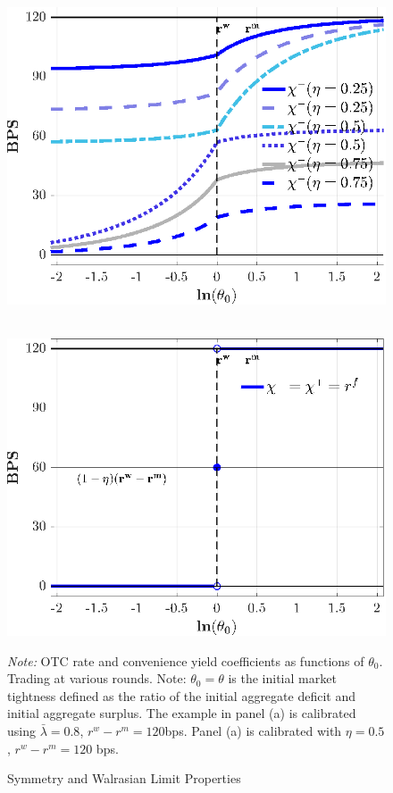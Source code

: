 \documentclass[12pt,american,english,notitlepage]{article}
\begin{document}
\begin{figure}[h]
\centering{}
\begin{minipage}[b]{.45\linewidth}
 \\[4pt]
\includegraphics[width=1\linewidth]{NewCode/Figures/F_l_symmetry_theta.eps}
\end{minipage}
\hfill
    \begin{minipage}[b]{.45\linewidth}
     \\[4pt]
\includegraphics[width=1\linewidth]{NewCode/Figures/F_Walrasian_prices_theta.eps}
\end{minipage}
\caption{\label{fig:symmetry} Symmetry and Walrasian Limit Properties}

\parbox[b]{16cm}{\small{\emph{Note:} OTC rate and convenience yield coefficients as functions of $\theta_{0}$.
Trading at various rounds. Note: $\theta_{0}=\theta$ is the initial
market tightness defined as the ratio of the initial aggregate deficit
and initial aggregate surplus. The example in panel (a) is calibrated
using $\bar{\lambda}=0.8$, $r^{w}-r^{m}=120$bps. Panel (a) is calibrated
with $\eta=0.5$, $r^{w}-r^{m}=120$ bps. }} 
\end{figure}
\end{document}

